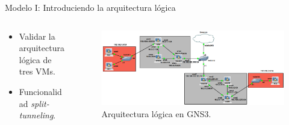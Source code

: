 \documentclass[serif, aspectratio=169]{beamer}
\begin{document}
\begin{frame}{Modelo I: Introduciendo la arquitectura lógica}
    \begin{columns}
        \begin{column}{0.35\textwidth}
            \begin{itemize}
                \item Validar la arquitectura lógica de tres VMs.
                \item Funcionalidad \textit{split-tunneling}.
            \end{itemize}
        \end{column}
        \begin{column}{0.6\textwidth}
            \begin{figure}
                \centering
                \includegraphics[width=\textwidth]{images/gns3_2.png}
                \caption{Arquitectura lógica en GNS3.}
            \end{figure}
        \end{column}
    \end{columns}
\end{frame}
\end{document}

